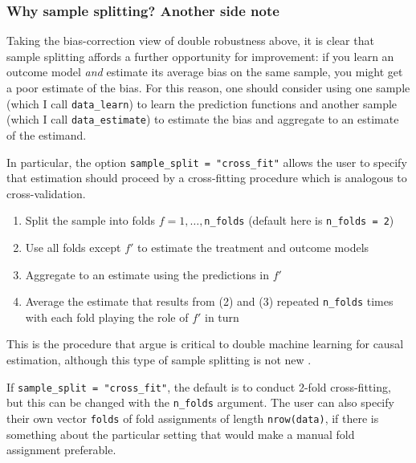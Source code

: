 \documentclass[
]{article}
\providecommand{\tightlist}{%
  \setlength{\itemsep}{0pt}\setlength{\parskip}{0pt}}
\begin{document}
\subsubsection{Why sample splitting? Another side note}\label{why-sample-splitting-another-side-note}

Taking the bias-correction view of double robustness above, it is clear that sample splitting affords a further opportunity for improvement: if you learn an outcome model \emph{and} estimate its average bias on the same sample, you might get a poor estimate of the bias. For this reason, one should consider using one sample (which I call \texttt{data\_learn}) to learn the prediction functions and another sample (which I call \texttt{data\_estimate}) to estimate the bias and aggregate to an estimate of the estimand.

In particular, the option \texttt{sample\_split\ =\ "cross\_fit"} allows the user to specify that estimation should proceed by a cross-fitting procedure which is analogous to cross-validation.

\begin{enumerate}
\def\labelenumi{\arabic{enumi}.}
\tightlist
\item
  Split the sample into folds \(f = 1,\dots,\)\texttt{n\_folds} (default here is \texttt{n\_folds\ =\ 2})\\
\item
  Use all folds except \(f'\) to estimate the treatment and outcome models\\
\item
  Aggregate to an estimate using the predictions in \(f'\)\\
\item
  Average the estimate that results from (2) and (3) repeated \texttt{n\_folds} times with each fold playing the role of \(f'\) in turn
\end{enumerate}

This is the procedure that \citet{chernozhukov2018} argue is critical to double machine learning for causal estimation, although this type of sample splitting is not new \citep{bickel1982}.

If \texttt{sample\_split\ =\ "cross\_fit"}, the default is to conduct 2-fold cross-fitting, but this can be changed with the \texttt{n\_folds} argument. The user can also specify their own vector \texttt{folds} of fold assignments of length \texttt{nrow(data)}, if there is something about the particular setting that would make a manual fold assignment preferable.
\end{document}
